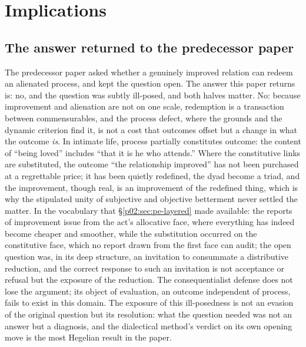 \documentclass[11pt,a4paper]{article}
\begin{document}
\section{Implications}
\label{p02:sec:implications}

\subsection{The answer returned to the predecessor paper}
\label{p02:sec:implications-answer}

The predecessor paper asked whether a genuinely improved relation can redeem an alienated process, and kept the question open. The answer this paper returns is: no, and the question was subtly ill-posed, and both halves matter. No: because improvement and alienation are not on one scale, redemption is a transaction between commensurables, and the process defect, where the grounds and the dynamic criterion find it, is not a cost that outcomes offset but a change in what the outcome \emph{is}. In intimate life, process partially constitutes outcome: the content of ``being loved'' includes ``that it is he who attends.'' Where the constitutive links are substituted, the outcome ``the relationship improved'' has not been purchased at a regrettable price; it has been quietly redefined, the dyad become a triad, and the improvement, though real, is an improvement of the redefined thing, which is why the stipulated unity of subjective and objective betterment never settled the matter. In the vocabulary that \S\ref{p02:sec:pe-layered} made available: the reports of improvement issue from the act's allocative face, where everything has indeed become cheaper and smoother, while the substitution occurred on the constitutive face, which no report drawn from the first face can audit; the open question was, in its deep structure, an invitation to consummate a distributive reduction, and the correct response to such an invitation is not acceptance or refusal but the exposure of the reduction. The consequentialist defense does not lose the argument; its object of evaluation, an outcome independent of process, fails to exist in this domain. The exposure of this ill-posedness is not an evasion of the original question but its resolution: what the question needed was not an answer but a diagnosis, and the dialectical method's verdict on its own opening move is the most Hegelian result in the paper.
\end{document}
